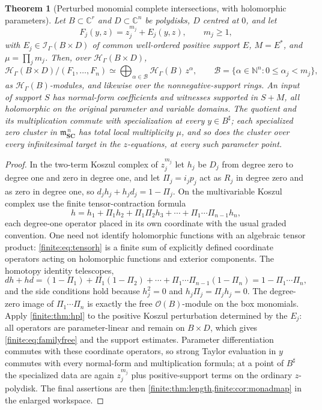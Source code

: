 \documentclass[11pt,letterpaper]{article}
\newtheorem{theorem}{Theorem}[section]
\theoremstyle{definition}
\theoremstyle{remark}
\newcommand{\SC}{\mathbf{SC}}
\newcommand{\C}{\mathbb C}
\newcommand{\N}{\mathbb N}
\newcommand{\OO}{\mathcal O}
\newcommand{\HH}{\mathscr H}
\newcommand{\Ip}{\mathscr I}
\newcommand{\mm}{\mathfrak m}
\newcommand{\sh}{^{\sharp}}
\newcommand{\bx}{\mathcal B}
\numberwithin{equation}{section}
\begin{document}
\begin{theorem}[Perturbed monomial complete intersections, with holomorphic parameters]
\label{finite:thm:family}
Let $B\subset\C^r$ and $D\subset\C^n$ be polydisks, $D$ centred at $0$, and let
\begin{equation}\label{finite:eq:monomialfamily}
 F_j(y,z)=z_j^{m_j}+E_j(y,z),\qquad m_j\geq1,
\end{equation}
with $E_j\in\Ip_\Gamma(B\times D)$ of common well-ordered positive support $E$, $M=E^*$, and $\mu=\prod_jm_j$. Then, over $\HH_\Gamma(B\times D)$,
\begin{equation}\label{finite:eq:familyfree}
 \HH_\Gamma(B\times D)/(F_1,\ldots,F_n)
 \simeq\bigoplus_{\alpha\in\bx}\HH_\Gamma(B)\,z^\alpha,
 \qquad
 \bx=\{\alpha\in\N^n:0\leq\alpha_j<m_j\},
\end{equation}
as $\HH_\Gamma(B)$-modules, and likewise over the nonnegative-support rings. An input of support $S$ has normal-form coefficients and witnesses supported in $S+M$, all holomorphic on the original parameter and variable domains. The quotient and its multiplication commute with specialization at every $y\in B\sh$; each specialized zero cluster in $\mm_{\SC}^{\,n}$ has total local multiplicity $\mu$, and so does the cluster over every infinitesimal target in the $z$-equations, at every such parameter point.
\end{theorem}

\begin{proof}
In the two-term Koszul complex of $z_j^{m_j}$ let $h_j$ be $D_j$ from degree zero to degree one and zero in degree one, and let $\Pi_j=i_jp_j$ act as $R_j$ in degree zero and as zero in degree one, so $d_jh_j+h_jd_j=1-\Pi_j$. On the multivariable Koszul complex use the finite tensor-contraction formula
\begin{equation}\label{finite:eq:tensorh}
 h=h_1+\Pi_1h_2+\Pi_1\Pi_2h_3+\cdots+\Pi_1\cdots\Pi_{n-1}h_n,
\end{equation}
each degree-one operator placed in its own coordinate with the usual graded convention. One need not identify holomorphic functions with an algebraic tensor product: \eqref{finite:eq:tensorh} is a finite sum of explicitly defined coordinate operators acting on holomorphic functions and exterior components. The homotopy identity telescopes,
\[
 dh+hd=(1-\Pi_1)+\Pi_1(1-\Pi_2)+\cdots+\Pi_1\cdots\Pi_{n-1}(1-\Pi_n)=1-\Pi_1\cdots\Pi_n,
\]
and the side conditions hold because $h_j^2=0$ and $h_j\Pi_j=\Pi_jh_j=0$. The degree-zero image of $\Pi_1\cdots\Pi_n$ is exactly the free $\OO(B)$-module on the box monomials. Apply \cref{finite:thm:hpl} to the positive Koszul perturbation determined by the $E_j$: all operators are parameter-linear and remain on $B\times D$, which gives \eqref{finite:eq:familyfree} and the support estimates. Parameter differentiation commutes with these coordinate operators, so strong Taylor evaluation in $y$ commutes with every normal-form and multiplication formula; at a point of $B\sh$ the specialized data are again $z_j^{m_j}$ plus positive-support terms on the ordinary $z$-polydisk. The final assertions are then \cref{finite:thm:length,finite:cor:monadmap} in the enlarged workspace.
\end{proof}
\end{document}
